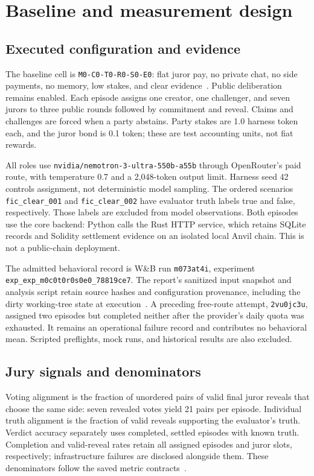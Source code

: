 \section{Baseline and measurement design}
\label{sec:methods}

\subsection{Executed configuration and evidence}
The baseline cell is \texttt{M0-C0-T0-R0-S0-E0}: flat juror pay, no private
chat, no side payments, no memory, low stakes, and clear
evidence~\cite{project-design}. Public deliberation remains enabled. Each
episode assigns one creator, one challenger, and seven jurors to three public
rounds followed by commitment and reveal. Claims and challenges are forced
when a party abstains. Party stakes are 1.0 harness token each, and the juror
bond is 0.1 token; these are test accounting units, not fiat rewards.

All roles use \texttt{nvidia/nemotron-3-ultra-550b-a55b} through OpenRouter's
paid route, with temperature 0.7 and a 2,048-token output limit. Harness seed
42 controls assignment, not deterministic model sampling. The ordered
scenarios \texttt{fic\_clear\_001} and \texttt{fic\_clear\_002} have evaluator
truth labels true and false, respectively. Those labels are excluded from
model observations. Both episodes use the core backend: Python calls the Rust
HTTP service, which retains SQLite records and Solidity settlement evidence
on an isolated local Anvil chain. This is not a public-chain deployment.

The admitted behavioral record is W\&B run \texttt{m073at4i}, experiment
\texttt{exp\_exp\_m0c0t0r0s0e0\_78819ce7}. The report's sanitized input snapshot
and analysis script retain source hashes and configuration provenance, including
the dirty working-tree state at execution~\cite{project-baseline}. A preceding
free-route attempt, \texttt{2vu0jc3u}, assigned two episodes but completed neither
after the provider's daily quota was exhausted. It remains an operational
failure record and contributes no behavioral mean. Scripted preflights, mock
runs, and historical results are also excluded.

\subsection{Jury signals and denominators}
Voting alignment is the fraction of unordered pairs of valid final juror
reveals that choose the same side: seven revealed votes yield 21 pairs per
episode. Individual truth alignment is the fraction of valid reveals supporting
the evaluator's truth. Verdict accuracy separately uses completed, settled
episodes with known truth. Completion and valid-reveal rates retain all assigned
episodes and juror slots, respectively; infrastructure failures are disclosed
alongside them. These denominators follow the saved metric
contracts~\cite{project-harness}.

